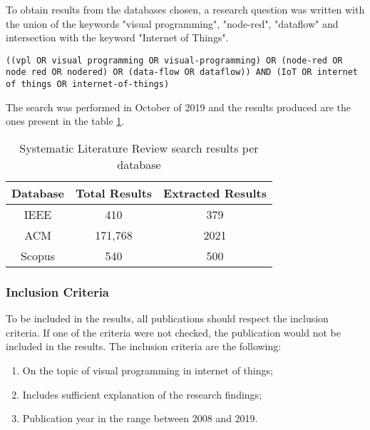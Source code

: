 To obtain results from the databases chosen, a research question was written with the union of the keywords "visual programming", "node-red", "dataflow" and intersection with the keyword "Internet of Things".

\noindent
\begin{lstlisting}[frame=none, numbers=none, backgroundcolor=\color{white},]
((vpl OR visual programming OR visual-programming) OR (node-red OR node red OR nodered) OR (data-flow OR dataflow)) AND (IoT OR internet of things OR internet-of-things)
\end{lstlisting}

The search was performed in October of 2019 and the results produced are the ones present in the table \ref{tab:slr_search_results}.

\captionsetup{belowskip=12pt,aboveskip=4pt}
\begin{table}[ht]
    \centering
    \caption{Systematic Literature Review search results per database}
    \begin{tabular}{| c | c | c |}
        \hline
        \textbf{Database} & \textbf{Total Results} & \textbf{Extracted Results}\\
        \hline
        IEEE & 410 & 379 \\
        \hline
        ACM & 171,768 & 2021 \\
        \hline
        Scopus & 540 & 500 \\
        \hline
    \end{tabular}
    \label{tab:slr_search_results}
\end{table}{}

\subsubsection{Inclusion Criteria}\label{sec:inclusion}

To be included in the results, all publications should respect the inclusion criteria. If one of the criteria were not checked, the publication would not be included in the results. The inclusion criteria are the following:

\begin{enumerate}
    \item On the topic of visual programming in internet of things;
    \item Includes sufficient explanation of the research findings;
    \item Publication year in the range between 2008 and 2019.
\end{enumerate}{}

